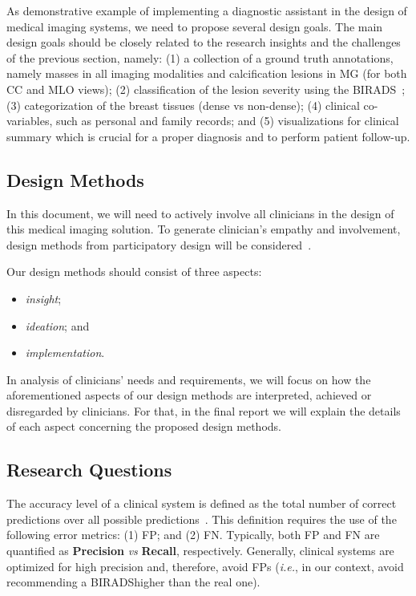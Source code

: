 As demonstrative example of implementing a diagnostic assistant in the design of medical imaging systems, we need to propose several design goals.
The main design goals should be closely related to the research insights and the challenges of the previous section, namely:
(1) a collection of a ground truth annotations, namely masses in all imaging modalities and calcification lesions in MG (for both CC and MLO views);
(2) classification of the lesion severity using the BIRADS~\cite{aghaei2018association};
(3) categorization of the breast tissues (dense vs non-dense);
(4) clinical co-variables, such as personal and family records; and
(5) visualizations for clinical summary which is crucial for a proper diagnosis and to perform patient follow-up.

\subsection{Design Methods}
\label{sec:sec00304}

In this document, we will need to actively involve all clinicians in the design of this medical imaging solution.
To generate clinician's empathy and involvement, design methods from participatory design will be considered~\cite{10.1145/3025453.3025873}.

\break

\noindent
Our design methods should consist of three aspects:

\begin{itemize}
\item {\it insight};
\item {\it ideation}; and
\item {\it implementation}.
\end{itemize}

In analysis of clinicians' needs and requirements, we will focus on how the aforementioned aspects of our design methods are interpreted, achieved or disregarded by clinicians.
For that, in the final report we will explain the details of each aspect concerning the proposed design methods.

\subsection{Research Questions}
\label{sec:sec00305}

The accuracy level of a clinical system is defined as the total number of correct predictions over all possible predictions~\cite{seref2019performance}.
This definition requires the use of the following error metrics:
(1) FP; and
(2) FN.
Typically, both FP and FN are quantified as {\bf Precision} {\it vs} {\bf Recall}, respectively.
Generally, clinical systems are optimized for high precision and, therefore, avoid FPs ({\it i.e.}, in our context, avoid recommending a BIRADS\footnotemark[2] higher than the real one).

